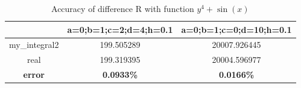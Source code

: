 \documentclass[
	12pt, %
]{fphw}
\numberwithin{equation}{section}
\numberwithin{figure}{section}
\numberwithin{table}{section}
\begin{document}
\begin{table}
	\centering
	\caption{Accuracy of difference R with function $y^4+\sin(x)$}
	\label{table2}
	\begin{tabular}{ccc}
		\toprule
		               & a=0;b=1;c=2;d=4;h=0.1 & a=0;b=1;c=0;d=10;h=0.1 \\
		\midrule
		my\_integral2  & 199.505289            & 20007.926445           \\
		real           & 199.319395            & 20004.596977           \\
		\textbf{error} & \textbf{0.0933\%}     & \textbf{0.0166\%}      \\
		\bottomrule
	\end{tabular}
\end{table}
\end{document}
